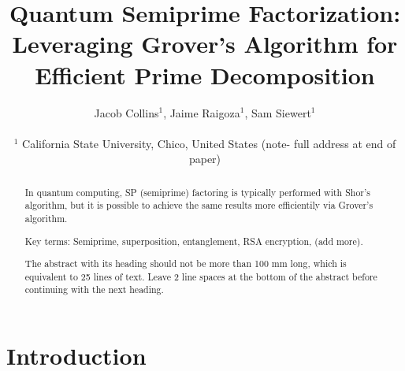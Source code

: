 \documentclass[twocolumn]{cinc}
\begin{document}


\title{Quantum Semiprime Factorization: Leveraging Grover's Algorithm for Efficient Prime Decomposition}


\author{Jacob Collins$^{1}$, Jaime Raigoza$^{1}$, Sam Siewert$^{1}$ \\
\ \\ %
 $^1$ California State University, Chico, United States (note- full address at end of paper)}

\maketitle

\begin{abstract}

  In quantum computing, SP (semiprime) factoring is typically performed 
  with Shor's algorithm, but it is possible to achieve the same results
  more efficientily via Grover's algorithm\cite{quantum_factoring, grover}. 

  Key terms: Semiprime, superposition, entanglement, RSA encryption, (add more).

  The abstract with its heading should not be more than 100 mm long,
  which is equivalent to 25 lines of text. Leave 2 line spaces at the
  bottom of the abstract before continuing with the next heading.


\end{abstract}

\section{Introduction}
\end{document}
